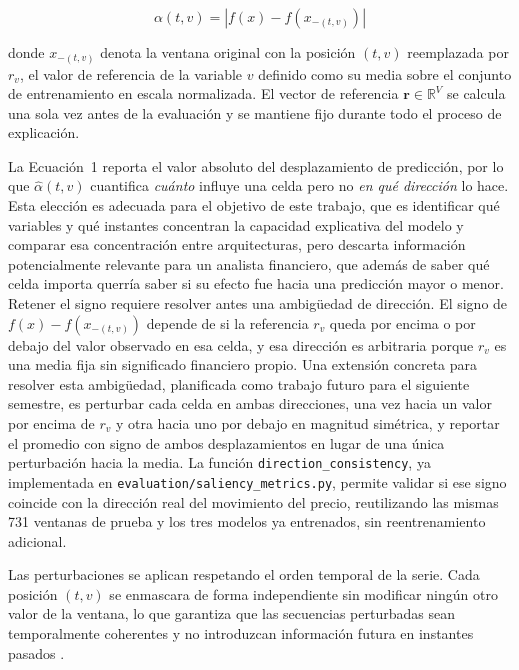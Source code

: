 \documentclass[conference, letterpaper]{IEEEtran}
\begin{document}
\begin{equation}
    \alpha(t, v) = \left| f(x) - f(x_{-(t,v)}) \right|
\end{equation}

donde $x_{-(t,v)}$ denota la ventana original con la posición 
$(t, v)$ reemplazada por $r_v$, el valor de referencia de la 
variable $v$ definido como su media sobre el conjunto de 
entrenamiento en escala normalizada. El vector de referencia 
$\mathbf{r} \in \mathbb{R}^V$ se calcula una sola vez antes de 
la evaluación y se mantiene fijo durante todo el proceso de 
explicación.

La Ecuación~1 reporta el valor absoluto del desplazamiento de
predicción, por lo que $\hat{\alpha}(t,v)$ cuantifica \emph{cuánto}
influye una celda pero no \emph{en qué dirección} lo hace. Esta
elección es adecuada para el objetivo de este trabajo, que es
identificar qué variables y qué instantes concentran la capacidad
explicativa del modelo y comparar esa concentración entre
arquitecturas, pero descarta información potencialmente relevante
para un analista financiero, que además de saber qué celda importa
querría saber si su efecto fue hacia una predicción mayor o menor.
Retener el signo requiere resolver antes una ambigüedad de dirección.
El signo de $f(x)-f(x_{-(t,v)})$ depende de si la referencia $r_v$
queda por encima o por debajo del valor observado en esa celda, y esa
dirección es arbitraria porque $r_v$ es una media fija sin significado
financiero propio. Una extensión concreta para resolver esta
ambigüedad, planificada como trabajo futuro para el siguiente
semestre, es perturbar cada celda en ambas direcciones, una vez hacia
un valor por encima de $r_v$ y otra hacia uno por debajo en magnitud
simétrica, y reportar el promedio con signo de ambos desplazamientos
en lugar de una única perturbación hacia la media. La función
\texttt{direction\_consistency}, ya implementada en
\texttt{evaluation/saliency\_metrics.py}, permite validar si ese
signo coincide con la dirección real del movimiento del precio,
reutilizando las mismas 731 ventanas de prueba y los tres modelos ya
entrenados, sin reentrenamiento adicional.

Las perturbaciones se aplican respetando el orden temporal de
la serie. Cada posición $(t, v)$ se enmascara de forma
independiente sin modificar ningún otro valor de la ventana, 
lo que garantiza que las secuencias perturbadas sean 
temporalmente coherentes y no introduzcan información futura 
en instantes pasados \cite{tonekaboni2020, crabbe2021}.
\end{document}
